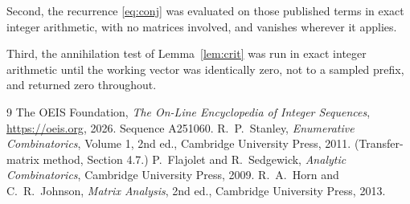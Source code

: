 \documentclass[11pt,a4paper]{article}
\theoremstyle{plain}
\theoremstyle{definition}
\begin{document}
Second, the recurrence \eqref{eq:conj} was evaluated on those published terms in exact
integer arithmetic, with no matrices involved, and vanishes wherever it applies.

Third, the annihilation test of Lemma~\ref{lem:crit} was run in exact integer arithmetic
until the working vector was identically zero, not to a sampled prefix, and returned zero
throughout.

\begin{thebibliography}{9}
 The OEIS Foundation, \emph{The On-Line Encyclopedia of Integer
Sequences}, \url{https://oeis.org}, 2026. Sequence A251060.
 R.~P.~Stanley, \emph{Enumerative Combinatorics}, Volume 1, 2nd ed.,
Cambridge University Press, 2011. (Transfer-matrix method, Section 4.7.)
 P.~Flajolet and R.~Sedgewick, \emph{Analytic Combinatorics}, Cambridge
University Press, 2009.
 R.~A.~Horn and C.~R.~Johnson, \emph{Matrix Analysis}, 2nd ed., Cambridge
University Press, 2013.
\end{thebibliography}
\end{document}
